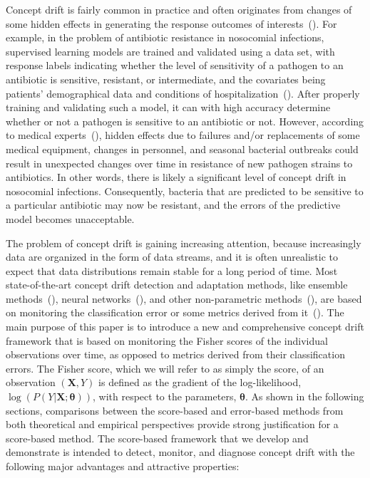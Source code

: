 \documentclass[twoside,11pt]{article}
\begin{document}
Concept drift is fairly common in practice and often originates from changes of some hidden effects in generating the response outcomes of interests~(\cite{tsymbal2008dynamic,vzliobaite2012beating,widmer1996learning,kukar2003drifting,donoho2004early,carmona2010gnusmail,fong2015change,vzliobaite2016overview}). For example, in the problem of antibiotic resistance in nosocomial infections, supervised learning models are trained and validated using a data set, with response labels indicating whether the level of sensitivity of a pathogen to an antibiotic is sensitive, resistant, or intermediate, and the covariates being patients' demographical data and conditions of hospitalization~(\cite{pechenizkiy2005knowledge}). After properly training and validating such a model, it can with high accuracy determine whether or not a pathogen is sensitive to an antibiotic or not. However, according to medical experts~(\cite{kukar2003drifting}), hidden effects due to failures and/or replacements of some medical equipment, changes in personnel, and seasonal bacterial outbreaks could result in unexpected changes over time in resistance of new pathogen strains to antibiotics. In other words, there is likely a significant level of concept drift in nosocomial infections. Consequently, bacteria that are predicted to be sensitive to a particular antibiotic may now be resistant, and the errors of the predictive model becomes unacceptable. 

The problem of concept drift is gaining increasing attention, because increasingly data are organized in the form of data streams, and it is often unrealistic to expect that data distributions remain stable for a long period of time. Most state-of-the-art concept drift detection and adaptation methods, like ensemble methods~(\cite{wang2003mining}), neural networks~(\cite{calandra2012learning}), and other non-parametric methods~(\cite{bifet2007learning,frias2015online}), are based on monitoring the classification error or some metrics derived from it~(\cite{ross2012exponentially,gonccalves2014comparative,barros2018large}). The main purpose of this paper is to introduce a new and comprehensive concept drift framework that is based on monitoring the Fisher scores of the individual observations over time, as opposed to metrics derived from their classification errors. The Fisher score, which we will refer to as simply the score, of an observation $(\bm{X}, Y)$ is defined as the gradient of the log-likelihood, $\log(P(Y|\bm{X};\bm{\theta}))$, with respect to the parameters, $\bm{\theta}$. As shown in the following sections, comparisons between the score-based and error-based methods from both theoretical and empirical perspectives provide strong justification for a score-based method. The score-based framework that we develop and demonstrate is intended to detect, monitor, and diagnose concept drift with the following major advantages and attractive properties:
\end{document}
